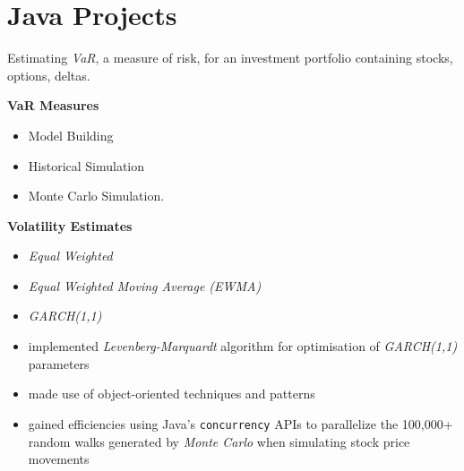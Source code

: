 \documentclass[../cv.tex]{subfiles}
\begin{document}
\section{Java Projects}
\begin{description}[style=multiline,leftmargin=4cm]
    \item[Value at Risk \textnormal{Dissertation} \textnormal{\tiny
              \href{https://adrian.ng/java/var/}{adrian.ng/java/var/}}]
          Estimating \textit{VaR}, a measure of risk, for an investment portfolio containing stocks, options, deltas.
          \begin{minipage}[b]{0.2\textwidth}
              \vspace{0.25cm}
              \textbf{VaR Measures}
              \begin{itemize}[leftmargin=*]
                  \tiny
                  \item Model Building
                  \item Historical Simulation
                  \item Monte Carlo Simulation.
              \end{itemize}
              \textbf{Volatility Estimates}
              \begin{itemize}[leftmargin=*]
                  \tiny
                  \item \textit{Equal Weighted}
                  \item \textit{Equal Weighted Moving Average (EWMA)}
                  \item \textit{GARCH(1,1)}
              \end{itemize}
          \end{minipage}
          \hspace{0.25cm}
          \begin{minipage}[b]{0.55\textwidth}
              \begin{itemize}[leftmargin=*]
                  \item implemented \textit{Levenberg-Marquardt} algorithm for optimisation of \textit{GARCH(1,1)} parameters
                  \item made use of object-oriented techniques and patterns
                  \item gained efficiencies using Java's \texttt{concurrency} APIs to parallelize the 100,000+ random walks generated by \textit{Monte Carlo} when simulating stock price movements

\end{itemize}
\end{minipage}
\end{description}
\end{document}
